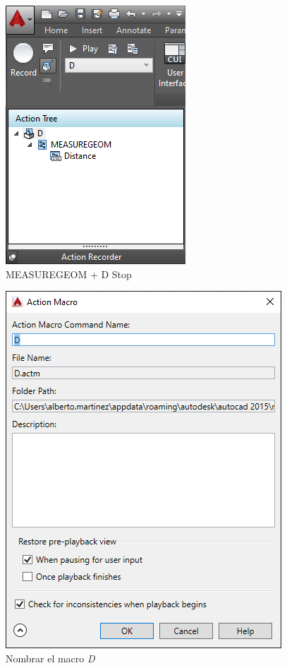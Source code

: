 \documentclass{report}
\begin{document}
\begin{figure}[H]
	\centering
	\includegraphics[width=0.65\linewidth, height=0.35\textheight,keepaspectratio]{Imagenes/autocad_measuregeom02}
	\caption{MEASUREGEOM + D \textrightarrow Stop}
	\label{fig:autocadmeasuregeom02}
\end{figure}

\begin{figure}[H]
	\centering
	\includegraphics[width=0.75\linewidth, height=0.45\textheight,keepaspectratio]{Imagenes/autocad_measuregeom03}
	\caption{Nombrar el macro \emph{D}}
	\label{fig:autocadmeasuregeom03}
\end{figure}
\end{document}
